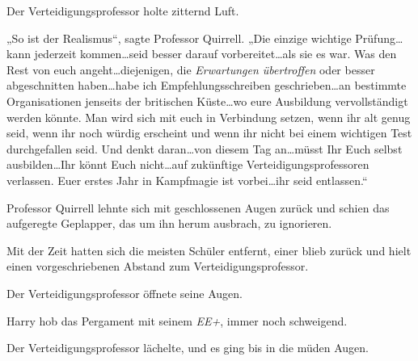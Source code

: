 Der Verteidigungsprofessor holte zitternd Luft.

„So ist der Realismus“, sagte Professor Quirrell. „Die einzige wichtige Prüfung…kann jederzeit kommen…seid besser darauf vorbereitet…als sie es war. Was den Rest von euch angeht…diejenigen, die \emph{Erwartungen übertroffen} oder besser abgeschnitten haben…habe ich Empfehlungsschreiben geschrieben…an bestimmte Organisationen jenseits der britischen Küste…wo eure Ausbildung vervollständigt werden könnte. Man wird sich mit euch in Verbindung setzen, wenn ihr alt genug seid, wenn ihr noch würdig erscheint und wenn ihr nicht bei einem wichtigen Test durchgefallen seid. Und denkt daran…von diesem Tag an…müsst Ihr Euch selbst ausbilden…Ihr könnt Euch nicht…auf zukünftige Verteidigungsprofessoren verlassen. Euer erstes Jahr in Kampfmagie ist vorbei…ihr seid entlassen.“

Professor Quirrell lehnte sich mit geschlossenen Augen zurück und schien das aufgeregte Geplapper, das um ihn herum ausbrach, zu ignorieren.

Mit der Zeit hatten sich die meisten Schüler entfernt, einer blieb zurück und hielt einen vorgeschriebenen Abstand zum Verteidigungsprofessor.

Der Verteidigungsprofessor öffnete seine Augen.

Harry hob das Pergament mit seinem \emph{EE+}, immer noch schweigend.

Der Verteidigungsprofessor lächelte, und es ging bis in die müden Augen.

